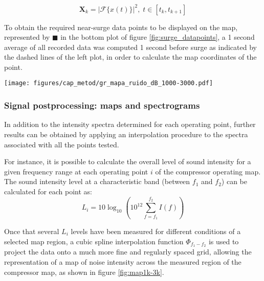 \begin{equation}
 \mathbf X_k=\left|\mathcal F\{x(t)\}\right|^2,\; t\in[t_k,t_{k+1}]
\end{equation}

To obtain the required near-surge data points to be displayed on the map, represented by $\blacksquare$ in the bottom plot of figure \ref{fig:surge_datapoints}, a 1 second average of all recorded data was computed 1 second before surge as indicated by the dashed lines of the left plot, in order to calculate the map coordinates of the point.

\begin{figure*}[tp!]
\centering
\texttt{[image: figures/cap\_metod/gr\_mapa\_ruido\_dB\_1000-3000.pdf]}
\caption[Sample of noise level map in the 1 -- 3 kHz band]{Sample of noise level in the 1 -- 3 kHz band obtained through the processing described in subsection \ref{sub:noise_maps_and_spectrograms}, including the measured data points $(\circ)$ and the paths later expanded as spectrograms shown in figure \ref{fig:spec50-5k}. The left hand side map represents the inlet duct, whereas the right hand side map represents the outlet duct. }
\label{fig:map1k-3k}
\end{figure*}

\subsubsection{Signal postprocessing: maps and spectrograms}
\label{sub:noise_maps_and_spectrograms}

In addition to the intensity spectra determined for each operating point, further results can be obtained by applying an interpolation procedure to the spectra associated with all the points tested.

For instance, it is possible to calculate the overall level of sound intensity for a given frequency range at each operating point $i$ of the compressor operating map. The sound intensity level at a characteristic band (between $f_1$ and $f_2$) can be calculated for each point as:
\begin{equation}\label{eq:point_level}
  L_i=10\log_{10}\left(10^{12}\sum_{f=f_1}^{f_2}I(f)\right)
\end{equation}

Once that several $L_i$ levels have been measured for different conditions of a selected map region, a cubic spline interpolation function $\Phi_{f_1-f_2}$ is used to project the data onto a much more fine and regularly spaced grid, allowing the representation of a map of noise intensity across the measured region of the compressor map, as shown in figure \ref{fig:map1k-3k}.

